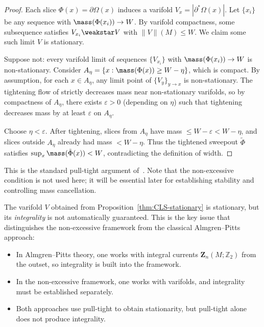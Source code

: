 \begin{proof}
Each slice $\Phi(x) = \partial\Omega(x)$ induces a varifold $V_x = |\partial^*\Omega(x)|$. Let $\{x_i\}$ be any sequence with $\mass(\Phi(x_i)) \to W$. By varifold compactness, some subsequence satisfies $V_{x_i} \weakstar V$ with $\|V\|(M) \leq W$. We claim some such limit $V$ is stationary.

Suppose not: every varifold limit of sequences $\{V_{x_i}\}$ with $\mass(\Phi(x_i)) \to W$ is non-stationary. Consider $A_\eta = \{x : \mass(\Phi(x)) \geq W - \eta\}$, which is compact. By assumption, for each $x \in A_\eta$, any limit point of $\{V_y\}_{y \to x}$ is non-stationary. The tightening flow of \cite{CL03} strictly decreases mass near non-stationary varifolds, so by compactness of $A_\eta$, there exists $\varepsilon > 0$ (depending on $\eta$) such that tightening decreases mass by at least $\varepsilon$ on $A_\eta$.

Choose $\eta < \varepsilon$. After tightening, slices from $A_\eta$ have mass $\leq W - \varepsilon < W - \eta$, and slices outside $A_\eta$ already had mass $< W - \eta$. Thus the tightened sweepout $\tilde{\Phi}$ satisfies $\sup_x \mass(\tilde{\Phi}(x)) < W$, contradicting the definition of width.
\end{proof}

This is the standard pull-tight argument of~\cite{CL03}. Note that the non-excessive condition is not used here; it will be essential later for establishing stability and controlling mass cancellation.

\begin{remark}
The varifold $V$ obtained from Proposition~\ref{thm:CLS-stationary} is stationary, but its \emph{integrality} is not automatically guaranteed. This is the key issue that distinguishes the non-excessive framework from the classical Almgren--Pitts approach:
\begin{itemize}
    \item In Almgren--Pitts theory, one works with integral currents $\mathbf{Z}_n(M;\mathbb{Z}_2)$ from the outset, so integrality is built into the framework.
    \item In the non-excessive framework, one works with varifolds, and integrality must be established separately.
    \item Both approaches use pull-tight to obtain stationarity, but pull-tight alone does not produce integrality.
\end{itemize}
\end{remark}

